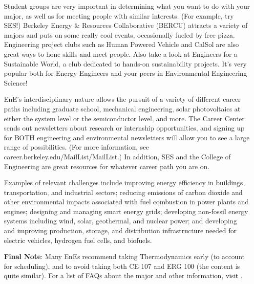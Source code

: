 Student groups are very important in determining what you want to do with your major, as well as for meeting people with similar interests. (For example, try SES!)
Berkeley Energy \& Resources Collaborative (BERCU) attracts a variety of majors and puts on some really cool events, occasionally fueled by free pizza. Engineering project clubs such as Human Powered Vehicle and CalSol are also great ways to hone skills and meet people.  Also take a look at Engineers for a Sustainable World, a club dedicated to hands-on sustainability projects.  It's very popular both for Energy Engineers and your peers in Environmental Engineering Science!
 
EnE’s interdisciplinary nature allows the pursuit of a variety of different career paths including graduate school, mechanical engineering, solar photovoltaics at either the system level or the semiconductor level, and more. The Career Center sends out newsletters about research or internship opportunities, and signing up for BOTH engineering and environmental newsletters will allow you to see a large range of possibilities. (For more information, see {\selectfont career.berkeley.edu/MailList/MailList}.) In addition, SES and the College of Engineering are great resources for whatever career path you are on.
 
Examples of relevant challenges include improving energy efficiency in buildings, transportation, and industrial sectors; reducing emissions of carbon dioxide and other environmental impacts associated with fuel combustion in power plants and engines; designing and managing smart energy grids; developing non-fossil energy systems including wind, solar, geothermal, and nuclear power; and developing and improving production, storage, and distribution infrastructure needed for electric vehicles, hydrogen fuel cells, and biofuels.

\textbf{Final Note}: Many EnEs recommend taking Thermodynamics early (to account for scheduling), and to avoid taking both CE 107 and ERG 100 (the content is quite similar). For a list of FAQs about the major and other information, visit {\selectfont {}}.